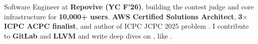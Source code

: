 \small{Software Engineer at \textbf{Repovive (YC F'26)}, building the contest judge and core infrastructure for \textbf{10,000+ users}. \textbf{AWS Certified Solutions Architect}, \textbf{3$\times$ ICPC ACPC finalist}, and author of ICPC JCPC 2025 problem . I contribute to \textbf{GitLab} and \textbf{LLVM} and write deep dives on , like .}
